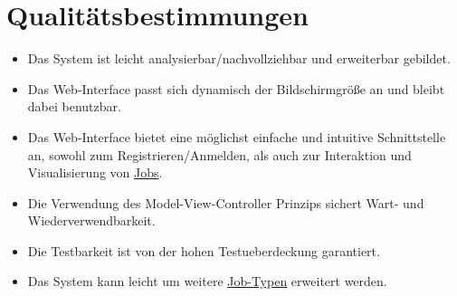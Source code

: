 \section{Qualitätsbestimmungen}
\begin{itemize}    
    \item Das System ist leicht analysierbar/nachvollziehbar und erweiterbar gebildet.
    \item Das \gls{Web-Interface} passt sich dynamisch der Bildschirmgröße an und bleibt dabei benutzbar.
    \item Das \gls{Web-Interface} bietet eine möglichst einfache und intuitive Schnittstelle an, sowohl zum Registrieren/Anmelden, als auch zur Interaktion und Visualisierung von \hyperref[B:Jobs]{Jobs}.
    \item Die Verwendung des \gls{Model-View-Controller} Prinzips sichert Wart- und Wiederverwendbarkeit.
    \item Die Testbarkeit ist von der hohen \gls{Testueberdeckung} garantiert.
    \item Das System kann leicht um weitere \hyperref[B:Job-Typ]{Job-Typen} erweitert werden.
\end{itemize}


